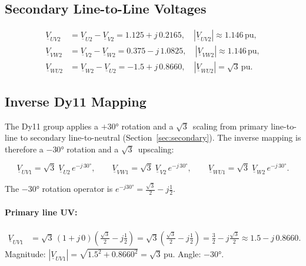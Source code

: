 \documentclass[a4paper,11pt]{article}
\begin{document}
\subsection{Secondary Line-to-Line Voltages}

\begin{align}
\underline{V}_{UV2} &= \underline{V}_{U2} - \underline{V}_{V2}
   = 1.125 + j\,0.2165, \quad |\underline{V}_{UV2}| \approx 1.146\,\mathrm{pu},\\
\underline{V}_{VW2} &= \underline{V}_{V2} - \underline{V}_{W2}
   = 0.375 - j\,1.0825, \quad |\underline{V}_{VW2}| \approx 1.146\,\mathrm{pu},\\
\underline{V}_{WU2} &= \underline{V}_{W2} - \underline{V}_{U2}
   = -1.5   + j\,0.8660, \quad |\underline{V}_{WU2}| = \sqrt{3}\,\mathrm{pu}.
\end{align}

\subsection{Inverse Dy11 Mapping}

The Dy11 group applies a $+30°$ rotation and a $\sqrt{3}$~scaling from
primary line-to-line to secondary line-to-neutral (Section~\ref{sec:secondary}).
The inverse mapping is therefore a $-30°$ rotation and a $\sqrt{3}$~upscaling:

\begin{equation}
\underline{V}_{UV1} = \sqrt{3}\;\underline{V}_{U2}\,e^{-j\,30°},
\qquad
\underline{V}_{VW1} = \sqrt{3}\;\underline{V}_{V2}\,e^{-j\,30°},
\qquad
\underline{V}_{WU1} = \sqrt{3}\;\underline{V}_{W2}\,e^{-j\,30°}.
\label{eq:inv_dy11}
\end{equation}

The $-30°$ rotation operator is
$e^{-j30°} = \tfrac{\sqrt{3}}{2} - j\tfrac{1}{2}$.

\paragraph{Primary line UV:}
\begin{align}
\underline{V}_{UV1}
  &= \sqrt{3}\,(1+j\,0)\!\left(\tfrac{\sqrt{3}}{2}-j\tfrac{1}{2}\right)
   = \sqrt{3}\!\left(\tfrac{\sqrt{3}}{2}-j\tfrac{1}{2}\right)
   = \tfrac{3}{2} - j\tfrac{\sqrt{3}}{2}
   \approx 1.5 - j\,0.8660.
\end{align}
Magnitude: $|\underline{V}_{UV1}| = \sqrt{1.5^2+0.8660^2}=\sqrt{3}\,\mathrm{pu}$. \quad
Angle: $-30°$.
\end{document}
